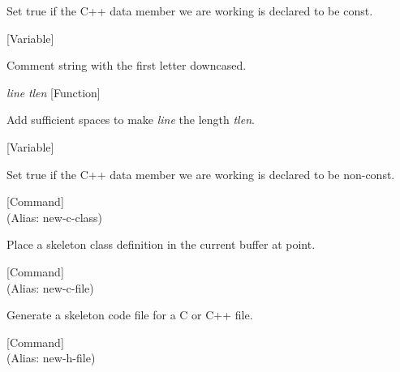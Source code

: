 \begin{doc-string}
Set true if the C++ data member we are working is declared to be const.
\end{doc-string}

\vspace{1em}
\noindent
{}
\usebox{\funcname}
 \hfill [Variable]

\begin{doc-string}
Comment string with the first letter downcased.
\end{doc-string}

\vspace{1em}
\noindent
{}
\usebox{\funcname}\emph{line} \emph{tlen}
 \hfill [Function]

\begin{doc-string}
Add sufficient spaces to make \emph{line} the length \emph{tlen}.
\end{doc-string}

\vspace{1em}
\noindent
{}
\usebox{\funcname}
 \hfill [Variable]

\begin{doc-string}
Set true if the C++ data member we are working is declared to be non-const.
\end{doc-string}

\vspace{1em}
\noindent
{}
\usebox{\funcname}
 \hfill [Command]\\%
 (Alias: new-c-class)

\begin{doc-string}
Place a skeleton class definition in the current buffer at point.
\end{doc-string}

\vspace{1em}
\noindent
{}
\usebox{\funcname}
 \hfill [Command]\\%
 (Alias: new-c-file)

\begin{doc-string}
Generate a skeleton code file for a C or C++ file.
\end{doc-string}

\vspace{1em}
\noindent
{}
\usebox{\funcname}
 \hfill [Command]\\%
 (Alias: new-h-file)

